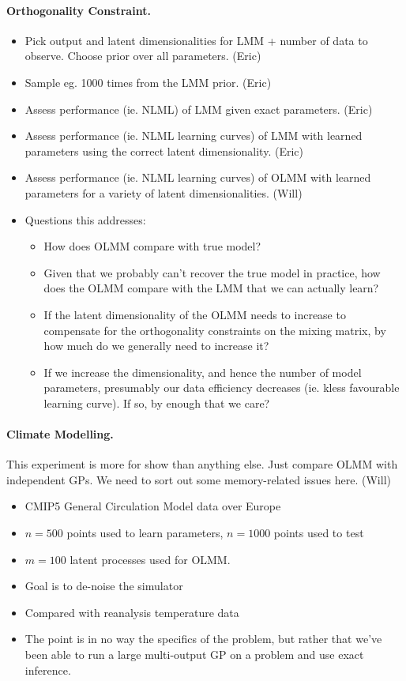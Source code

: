 \documentclass{article}
\begin{document}
\paragraph{Orthogonality Constraint.}
\begin{itemize}
    \item Pick output and latent dimensionalities for LMM + number of data to observe. Choose prior over all parameters. (Eric)
    \item Sample eg. 1000 times from the LMM prior. (Eric)
    \item Assess performance (ie. NLML) of LMM given exact parameters. (Eric)
    \item Assess performance (ie. NLML learning curves) of LMM with learned parameters using the correct latent dimensionality. (Eric)
    \item Assess performance (ie. NLML learning curves) of OLMM with learned parameters for a variety of latent dimensionalities. (Will)
    \item Questions this addresses:
    \begin{itemize}
        \item How does OLMM compare with true model?
        \item Given that we probably can't recover the true model in practice, how does the OLMM compare with the LMM that we can actually learn?
        \item If the latent dimensionality of the OLMM needs to increase to compensate for the orthogonality constraints on the mixing matrix, by how much do we generally need to increase it?
        \item If we increase the dimensionality, and hence the number of model parameters, presumably our data efficiency decreases (ie. kless favourable learning curve). If so, by enough that we care?
    \end{itemize}
\end{itemize}

\paragraph{Climate Modelling.} This experiment is more for show than anything else. Just compare OLMM with independent GPs. We need to sort out some memory-related issues here. (Will)

\begin{itemize}
    \item CMIP5 General Circulation Model data over Europe
    \item $n=500$ points used to learn parameters, $n=1000$ points used to test
    \item $m=100$ latent processes used for OLMM.
    \item Goal is to de-noise the simulator
    \item Compared with reanalysis temperature data
    \item The point is in no way the specifics of the problem, but rather that we've been able to run a large multi-output GP on a problem and use exact inference.
\end{itemize}
\end{document}
